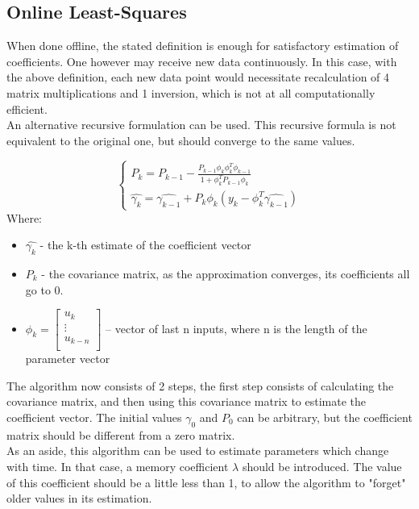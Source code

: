 \subsection{Online Least-Squares}
When done offline, the stated definition is enough for satisfactory estimation of coefficients. One however may receive new data continuously. In this case, with the above definition, each new data point would necessitate recalculation of 4 matrix multiplications and 1 inversion, which is not at all computationally efficient.\\
An alternative recursive formulation can be used. This recursive formula is not equivalent to the original one, but should converge to the same values.

{
    \begin{equation}
        \begin{cases}
            P_k = P_{k-1} - \frac{P_{k-1}\phi_k\phi_k^{T}\phi_{k-1}}{1+\phi_k^{T}P_{k-1}\phi_k}\\
            \hat{\gamma_k} = \hat{\gamma_{k-1}} + P_k\phi_k(y_k - \phi_k^{T}\hat{\gamma_{k-1}})
        \end{cases}
    \end{equation}
    Where:
    \begin{itemize}
        \item $\hat{\gamma_k}$ - the k-th estimate of the coefficient vector
        \item  $P_k$ - the covariance matrix, as the approximation converges, its coefficients all go to 0.
        \item  $\phi_k = \begin{bmatrix}
       u_k \\
                  \vdots \\
                  u_{k-n} \\
\end{bmatrix}$ -- vector of last  n inputs, where n is the length of the parameter vector
            
    \end{itemize}


    The algorithm now consists of 2 steps, the first step consists of calculating the covariance matrix, and then using this covariance matrix to estimate the coefficient vector. The initial values $\gamma_0$ and $P_0$ can be arbitrary, but the coefficient matrix should be different from a zero matrix.\\
    As an aside, this algorithm can be used to estimate parameters which change with time. In that case, a memory coefficient  $\lambda$ should be introduced. The value of this coefficient should be a little less than 1, to allow the algorithm to "forget" older values in its estimation.
}

